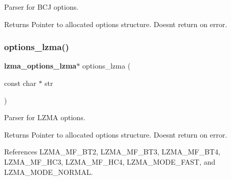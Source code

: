 Parser for B\+CJ options. 

\begin{DoxyReturn}{Returns}
Pointer to allocated options structure. Doesn\textquotesingle{}t return on error. 
\end{DoxyReturn}
\mbox{\label{options_8c_a80e4a9dd89d3f2fab00c48c4feb75126}} 
\subsubsection{options\+\_\+lzma()}
{\footnotesize\ttfamily \textbf{ lzma\+\_\+options\+\_\+lzma}$\ast$ options\+\_\+lzma (\begin{DoxyParamCaption}\item[{const char $\ast$}]{str }\end{DoxyParamCaption})}



Parser for L\+Z\+MA options. 

\begin{DoxyReturn}{Returns}
Pointer to allocated options structure. Doesn\textquotesingle{}t return on error. 
\end{DoxyReturn}


References L\+Z\+M\+A\+\_\+\+M\+F\+\_\+\+B\+T2, L\+Z\+M\+A\+\_\+\+M\+F\+\_\+\+B\+T3, L\+Z\+M\+A\+\_\+\+M\+F\+\_\+\+B\+T4, L\+Z\+M\+A\+\_\+\+M\+F\+\_\+\+H\+C3, L\+Z\+M\+A\+\_\+\+M\+F\+\_\+\+H\+C4, L\+Z\+M\+A\+\_\+\+M\+O\+D\+E\+\_\+\+F\+A\+ST, and L\+Z\+M\+A\+\_\+\+M\+O\+D\+E\+\_\+\+N\+O\+R\+M\+AL.

